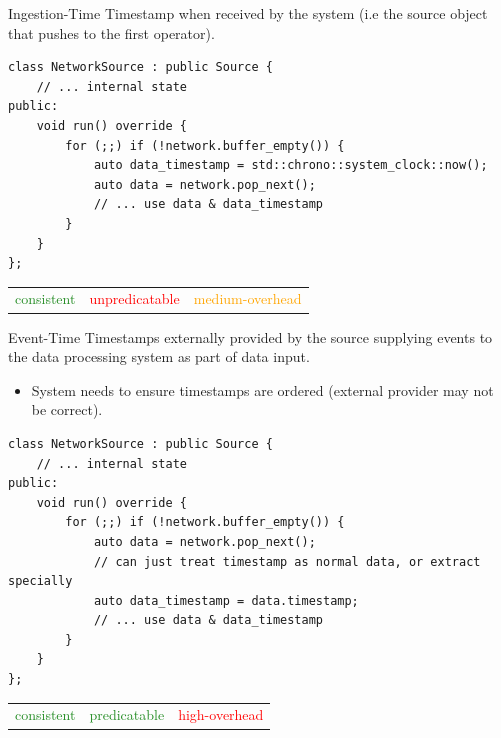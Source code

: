 \begin{definitionbox}{Ingestion-Time}
    Timestamp when received by the system (i.e the source object that pushes to the first operator).
    \begin{verbatim}
class NetworkSource : public Source {
    // ... internal state
public:
    void run() override {
        for (;;) if (!network.buffer_empty()) {
            auto data_timestamp = std::chrono::system_clock::now();
            auto data = network.pop_next();
            // ... use data & data_timestamp
        }
    }
};
    \end{verbatim}
    \begin{center}
        \begin{tabular}{c | c | c}
            \textcolor{ForestGreen}{consistent} & \textcolor{red}{unpredicatable} & \textcolor{orange}{medium-overhead} \\
        \end{tabular}
    \end{center}
\end{definitionbox}
\begin{definitionbox}{Event-Time}
    Timestamps externally provided by the source supplying events to the data processing system as part of data input.
    \begin{itemize}
        \item System needs to ensure timestamps are ordered (external provider may not be correct). 
    \end{itemize}
    \begin{verbatim}
class NetworkSource : public Source {
    // ... internal state
public:
    void run() override {
        for (;;) if (!network.buffer_empty()) {
            auto data = network.pop_next();
            // can just treat timestamp as normal data, or extract specially
            auto data_timestamp = data.timestamp;
            // ... use data & data_timestamp
        }
    }
};
    \end{verbatim}
    \begin{center}
        \begin{tabular}{c | c | c}
            \textcolor{ForestGreen}{consistent} & \textcolor{ForestGreen}{predicatable} & \textcolor{red}{high-overhead} \\
        \end{tabular}
    \end{center}
\end{definitionbox}

